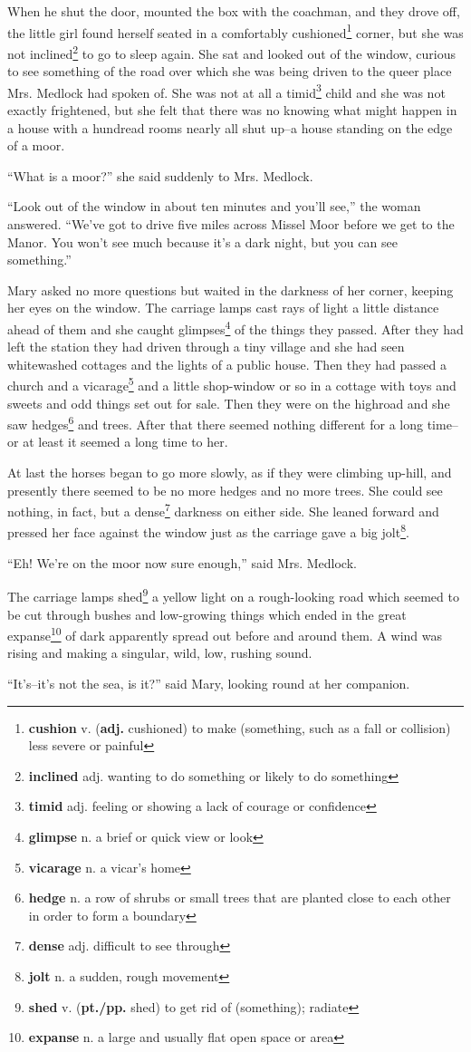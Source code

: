 When he shut the door, mounted the box with the coachman, and they drove off, the little girl found herself seated in a comfortably cushioned\footnote{\textbf{cushion} v. (\textbf{adj.} cushioned) to make (something, such as a fall or collision) less severe or painful} corner, but she was not inclined\footnote{\textbf{inclined} adj. wanting to do something or likely to do something} to go to sleep again. She sat and looked out of the window, curious to see something of the road over which she was being driven to the queer place Mrs. Medlock had spoken of. She was not at all a timid\footnote{\textbf{timid} adj. feeling or showing a lack of courage or confidence} child and she was not exactly frightened, but she felt that there was no knowing what might happen in a house with a hundread rooms nearly all shut up--a house standing on the edge of a moor.

``What is a moor?'' she said suddenly to Mrs. Medlock.

``Look out of the window in about ten minutes and you'll see,'' the woman answered. ``We've got to drive five miles across Missel Moor before we get to the Manor. You won't see much because it's a dark night, but you can see something.''

Mary asked no more questions but waited in the darkness of her corner, keeping her eyes on the window. The carriage lamps cast rays of light a little distance ahead of them and she caught glimpses\footnote{\textbf{glimpse} n. a brief or quick view or look} of the things they passed. After they had left the station they had driven through a tiny village and she had seen whitewashed cottages and the lights of a public house. Then they had passed a church and a vicarage\footnote{\textbf{vicarage} n. a vicar's home} and a little shop-window or so in a cottage with toys and sweets and odd things set out for sale. Then they were on the highroad and she saw hedges\footnote{\textbf{hedge} n. a row of shrubs or small trees that are planted close to each other in order to form a boundary} and trees. After that there seemed nothing different for a long time--or at least it seemed a long time to her.

At last the horses began to go more slowly, as if they were climbing up-hill, and presently there seemed to be no more hedges and no more trees. She could see nothing, in fact, but a dense\footnote{\textbf{dense} adj. difficult to see through} darkness on either side. She leaned forward and pressed her face against the window just as the carriage gave a big jolt\footnote{\textbf{jolt} n. a sudden, rough movement}.

``Eh! We're on the moor now sure enough,'' said Mrs. Medlock.

The carriage lamps shed\footnote{\textbf{shed} v. (\textbf{pt./pp.} shed) to get rid of (something); radiate} a yellow light on a rough-looking road which seemed to be cut through bushes and low-growing things which ended in the great expanse\footnote{\textbf{expanse} n. a large and usually flat open space or area} of dark apparently spread out before and around them. A wind was rising and making a singular, wild, low, rushing sound.

``It's--it's not the sea, is it?'' said Mary, looking round at her companion.
